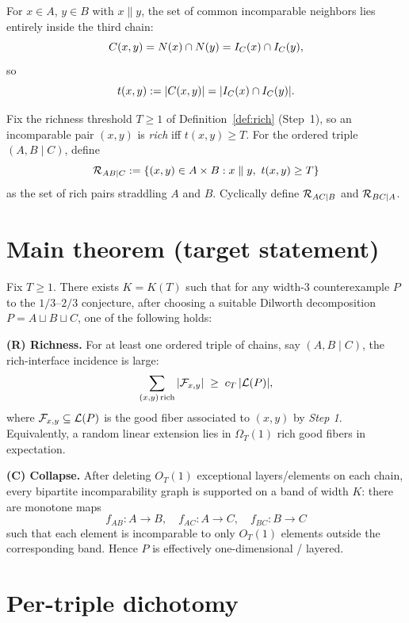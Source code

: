 For $x \in A$, $y \in B$ with $x \parallel y$, the set of common incomparable
neighbors lies entirely inside the third chain:
\[
C(x,y) = N(x) \cap N(y) = I_C(x) \cap I_C(y),
\]
so
\[
t(x,y) := |C(x,y)| = |I_C(x) \cap I_C(y)|.
\]

\begin{definition}\label{def:rich-triple}
Fix the richness threshold $T\ge 1$ of Definition~\ref{def:rich} (Step~1),
so an incomparable pair $(x,y)$ is \emph{rich} iff $t(x,y)\ge T$.
For the ordered triple $(A,B\mid C)$, define
\[
\mathcal{R}_{AB \mid C} := \{(x,y) \in A \times B : x \parallel y,\ t(x,y) \ge T\}
\]
as the set of rich pairs straddling $A$ and $B$.
Cyclically define $\mathcal{R}_{AC \mid B}$ and $\mathcal{R}_{BC \mid A}$.
\end{definition}

\section{Main theorem (target statement)}

\begin{theorem}\label{thm:step5}
Fix $T \ge 1$. There exists $K = K(T)$ such that for any width-3 counterexample
$P$ to the $1/3$--$2/3$ conjecture, after choosing a suitable Dilworth
decomposition $P = A \sqcup B \sqcup C$, one of the following holds:

\smallskip

\noindent\textbf{(R) Richness.} For at least one ordered triple of chains,
say $(A,B \mid C)$, the rich-interface incidence is large:
\[
\sum_{(x,y)\,\text{rich}} |\mathcal{F}_{x,y}| \;\ge\; c_T\,|\mathcal{L}(P)|,
\]
where $\mathcal{F}_{x,y} \subseteq \mathcal{L}(P)$ is the good fiber associated to $(x,y)$ by
\emph{Step 1}. Equivalently, a random linear extension lies in $\Omega_T(1)$
rich good fibers in expectation.

\smallskip

\noindent\textbf{(C) Collapse.} After deleting $O_T(1)$ exceptional
layers/elements on each chain, every bipartite incomparability graph is
supported on a band of width $K$: there are monotone maps
\[
f_{AB}: A \to B,\quad f_{AC}: A \to C,\quad f_{BC}: B \to C
\]
such that each element is incomparable to only $O_T(1)$ elements outside the
corresponding band. Hence $P$ is effectively one-dimensional / layered.
\end{theorem}

\section{Per-triple dichotomy}

